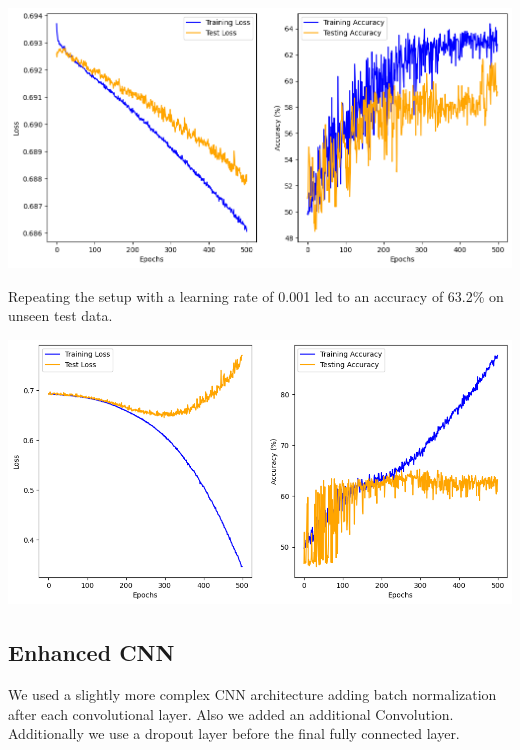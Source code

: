 \includegraphics*[width=\textwidth]{Figures/CNN_classifier_charts.png}

Repeating the setup with a learning rate of 0.001 led to an accuracy of 63.2\%
on unseen test data.

\includegraphics*[width=\textwidth]{Figures/CNN_classifier_lr_001_charts.png}

\subsection*{Enhanced CNN}

We used a slightly more complex CNN architecture adding batch normalization
after each convolutional layer. Also we added an additional Convolution.
Additionally we use a dropout layer before the final fully connected layer.


